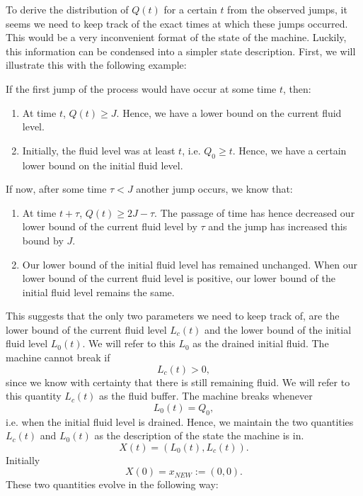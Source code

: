 To derive the distribution of $Q(t)$ for a certain $t$ from the observed jumps, it seems we need to keep track of the exact times at which these jumps occurred.
This would be a very inconvenient format of the state of the machine.
Luckily, this information can be condensed into a simpler state description.
First, we will illustrate this with the following example:
\begin{example}
	If the first jump of the process would have occur at some time $t$, then:
	\begin{enumerate}
		\item At time $t$, $Q(t)\geq J$.
		Hence, we have a lower bound on the current fluid level.
		\item Initially, the fluid level was at least $t$, i.e. $Q_0\geq t$.
		Hence, we have a certain lower bound on the initial fluid level.
	\end{enumerate}
	If now, after some time $\tau<J$ another jump occurs, we know that:
	\begin{enumerate}
		\item At time $t+\tau$, $Q(t)\geq 2J-\tau$.
		The passage of time has hence decreased our lower bound of the current fluid level by $\tau$ and the jump has increased this bound by $J$.
		\item Our lower bound of the initial fluid level has remained unchanged.
		When our lower bound of the current fluid level is positive, our lower bound of the initial fluid level remains the same.
	\end{enumerate}
\end{example}
This suggests that the only two parameters we need to keep track of, are the lower bound of the current fluid level $L_c(t)$ and the lower bound of the initial fluid level $L_0(t)$.
We will refer to this $L_0$ as the drained initial fluid.
The machine cannot break if 
\[L_c(t)>0,\]
since we know with certainty that there is still remaining fluid.
We will refer to this quantity $L_c(t)$ as the fluid buffer.
The machine breaks whenever
\[L_0(t)=Q_0,\]
i.e. when the initial fluid level is drained.
Hence, we maintain the two quantities $L_c(t)$ and $L_0(t)$ as the description of the state the machine is in.
\[
X(t)=(L_0(t),L_c(t)).
\]
Initially
\[
X(0)=x_{NEW}:=(0,0).
\]
These two quantities evolve in the following way:
